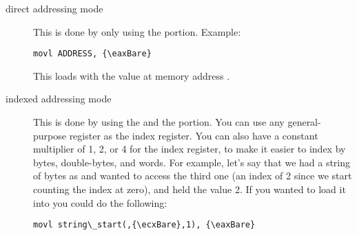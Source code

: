 \begin{description}
\item[direct addressing mode] This is done by only using the  portion.  Example:
\begin{simpletyping}
\begin{lstlisting}
movl ADDRESS, {\eaxBare}
\end{lstlisting}
\end{simpletyping}

This loads {\eaxReg} with the value at memory address .
\item[indexed addressing mode] This is done by using the  and the
 portion.  You can use any general-purpose
register as the index register.  You can also have a constant
multiplier of 1, 2, or 4 for the index register, to make it easier to
index by bytes, double-bytes, and words.  For example, let's say that
we had a string of bytes as  and wanted
to access the third one (an index of 2 since we start counting the
index at zero), and {\ecxReg} held the value 2.  If you wanted to load it
into {\eaxReg} you could do the following:
\begin{simpletyping}
\begin{lstlisting}
movl string\_start(,{\ecxBare},1), {\eaxBare}
\end{lstlisting}
\end{simpletyping}


\end{description}
